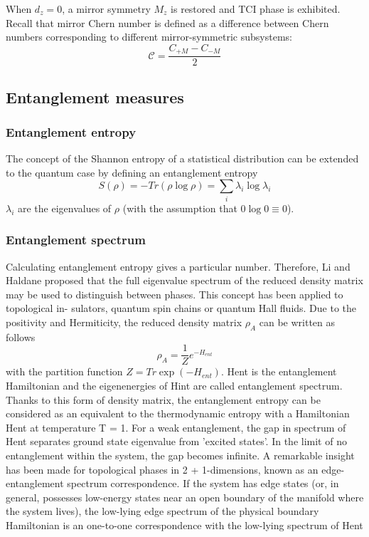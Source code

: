When $d_z = 0$, a mirror symmetry $M_z$ is restored and TCI phase is exhibited. Recall that mirror Chern number is defined as a difference between Chern numbers corresponding to different mirror-symmetric subsystems:
\begin{equation}
\mathcal{C} = \frac{C_{+ M} - C_{-M}}{2}
\label{eq:mirror_chern}
\end{equation}

\subsection{Entanglement measures}

\subsubsection{Entanglement entropy}
The concept of the Shannon entropy of a statistical distribution can be extended to the quantum case by defining an entanglement entropy 
\begin{equation}
S( \rho) = -Tr (\rho \log \rho) = \sum_i \lambda_i \log \lambda_i
\end{equation}
$\lambda_i$ are the eigenvalues of $\rho$ (with the assumption that $0 \log 0 \equiv 0$).


\subsubsection{Entanglement spectrum}
Calculating entanglement entropy gives a particular number. Therefore, Li and Haldane proposed that the full eigenvalue spectrum of the reduced density matrix may be used to distinguish between phases. This concept has been applied to topological in- sulators, quantum spin chains or quantum Hall fluids. Due to the positivity and Hermiticity, the reduced density matrix $\rho_A$ can be written as follows
\begin{equation}
\rho_A = \frac{1}{Z} e^{-H_{ent}}
\end{equation}
with the partition function $Z = Tr \exp (-H_{ent})$. Hent is the entanglement Hamiltonian and the eigenenergies of Hint are called entanglement spectrum. Thanks to this form of density matrix, the entanglement entropy can be considered as an equivalent to the thermodynamic entropy with a Hamiltonian Hent at temperature T = 1. For a weak entanglement, the gap in spectrum of Hent separates ground state eigenvalue from ’excited states’. In the limit of no entanglement within the system, the gap becomes infinite. A remarkable insight has been made for topological phases in 2 + 1-dimensions, known as an edge-entanglement spectrum correspondence. If the system has edge states (or, in general, possesses low-energy states near an open boundary of the manifold where the system lives), the low-lying edge spectrum of the physical boundary Hamiltonian is an one-to-one correspondence with the low-lying spectrum of Hent

